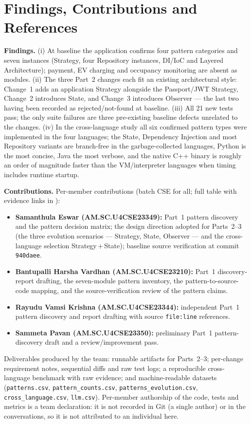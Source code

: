 \documentclass[11pt,a4paper]{article}
\begin{document}
\section{Findings, Contributions and References}
\begin{sloppypar}
\textbf{Findings.} (i) At baseline the application confirms four pattern
categories and seven instances (Strategy, four Repository instances, DI/IoC and
Layered Architecture); payment, EV charging and occupancy monitoring are absent
as modules. (ii) The three Part~2 changes each fit an existing architectural
style: Change~1 adds an application Strategy alongside the Passport/JWT Strategy,
Change~2 introduces State, and Change~3 introduces Observer --- the last two
having been recorded as rejected/not-found at baseline. (iii) All 21 new tests
pass; the only suite failures are three pre-existing baseline defects unrelated
to the changes. (iv) In the cross-language study all six confirmed pattern types
were implemented in the four languages; the State, Dependency Injection and most
Repository variants are branch-free in the garbage-collected languages, Python is
the most concise, Java the most verbose, and the native C++ binary is roughly an
order of magnitude faster than the VM/interpreter languages when timing includes
runtime startup.
\end{sloppypar}

\noindent\textbf{Contributions.} Per-member contributions (batch CSE for all;
full table with evidence links in ):
\begin{itemize}
  \item \textbf{Samanthula Eswar (AM.SC.U4CSE23349):} Part~1 pattern discovery and
        the pattern decision matrix; the design direction adopted for Parts~2--3
        (the three evolution scenarios --- Strategy, State, Observer --- and the
        cross-language selection Strategy\,+\,State); baseline source verification
        at commit \texttt{940daee}.
  \item \textbf{Bantupalli Harsha Vardhan (AM.SC.U4CSE23210):} Part~1 discovery-report
        drafting, the seven-module pattern inventory, the pattern-to-source-code
        mapping, and the source-verification review of the pattern claims.
  \item \textbf{Rayudu Vamsi Krishna (AM.SC.U4CSE23344):} independent Part~1 pattern
        discovery and report drafting with source \texttt{file:line} references.
  \item \textbf{Sammeta Pavan (AM.SC.U4CSE23350):} preliminary Part~1
        pattern-discovery draft and a review/improvement pass.
\end{itemize}
Deliverables produced by the team: runnable artifacts for Parts~2--3; per-change
requirement notes, sequential diffs and raw test logs; a reproducible
cross-language benchmark with raw evidence; and machine-readable datasets
(\texttt{patterns.csv}, \texttt{pattern\_counts.csv}, \texttt{patterns\_evolution.csv},
\texttt{cross\_language.csv}, \texttt{llm.csv}). Per-member authorship of the
code, tests and metrics is a team declaration: it is not recorded in Git (a single
author) or in the conversations, so it is not attributed to an individual here.
\end{document}
